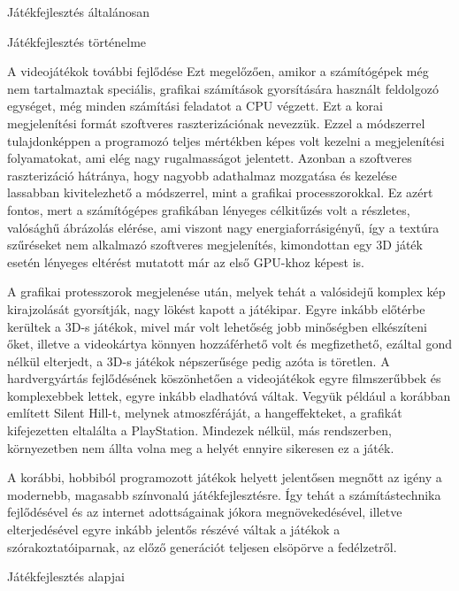 \begin{MyChapter}{Játékfejlesztés általánosan}
\begin{MySection}{Játékfejlesztés történelme}
\begin{MySubSection}{A videojátékok további fejlődése}
		Ezt megelőzően, amikor a számítógépek még nem tartalmaztak speciális, grafikai számítások gyorsítására használt feldolgozó egységet, még minden számítási feladatot a CPU végzett. Ezt a korai megjelenítési formát szoftveres raszterizációnak nevezzük. Ezzel a módszerrel tulajdonképpen a programozó teljes mértékben képes volt kezelni a megjelenítési folyamatokat, ami elég nagy rugalmasságot jelentett.
		Azonban a szoftveres raszterizáció hátránya, hogy nagyobb adathalmaz mozgatása és kezelése lassabban kivitelezhető a módszerrel, mint a grafikai processzorokkal.
		Ez azért fontos, mert a számítógépes grafikában lényeges célkitűzés volt a részletes, valósághű ábrázolás elérése, ami viszont nagy energiaforrásigényű, így a textúra szűréseket nem alkalmazó szoftveres megjelenítés, kimondottan egy 3D játék esetén lényeges eltérést mutatott már az első GPU-khoz képest is. \cite{mileff}
		
		A grafikai protesszorok megjelenése után, melyek tehát a valósidejű komplex kép kirajzolását gyorsítják, nagy lökést kapott a játékipar. Egyre inkább előtérbe kerültek a 3D-s játékok, mivel már volt lehetőség jobb minőségben elkészíteni őket, illetve a videokártya könnyen hozzáférhető volt és megfizethető, ezáltal gond nélkül elterjedt, a 3D-s játékok népszerűsége pedig azóta is töretlen.
		A hardvergyártás fejlődésének köszönhetően a videojátékok egyre filmszerűbbek és komplexebbek lettek, egyre inkább eladhatóvá váltak. Vegyük például a korábban említett Silent Hill-t, melynek atmoszféráját, a hangeffekteket, a grafikát kifejezetten eltalálta a PlayStation. Mindezek nélkül, más rendszerben, környezetben nem állta volna meg a helyét ennyire sikeresen ez a játék.
		
		A korábbi, hobbiból programozott játékok helyett jelentősen megnőtt az igény a modernebb, magasabb színvonalú játékfejlesztésre. 
		Így tehát a számítástechnika fejlődésével és az internet adottságainak jókora megnövekedésével, illetve elterjedésével egyre inkább jelentős részévé váltak a játékok a szórakoztatóiparnak, az előző generációt teljesen elsöpörve a fedélzetről.
		\end{MySubSection}
				
	\end{MySection}

	\begin{MySection}{Játékfejlesztés alapjai} 
		

\end{MySection}
\end{MyChapter}

